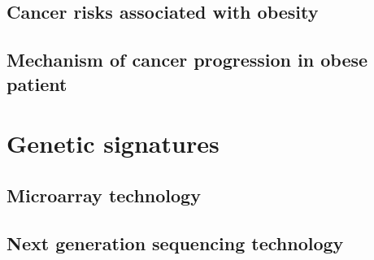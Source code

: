 \subsection{Cancer risks associated with obesity}
\label{sub:cancer_risks_associated_with_obesity}

\citep{Calle2003}

\subsection{Mechanism of cancer progression in obese patient}
\label{sub:mechanism_of_cancer_progression_in_obese_patient}





\section{Genetic signatures}
\label{sec:genetic_signatures}

\subsection{Microarray technology}
\label{subsec:microarray_technology}

\subsection{Next generation sequencing technology}
\label{sub:next_generation sequencing_technology}





